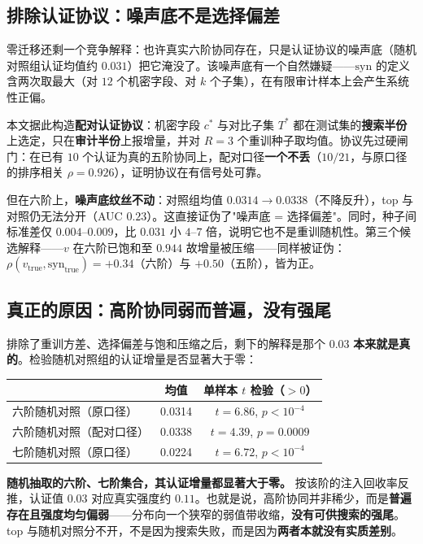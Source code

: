 \documentclass[10.5pt,compsoc,UTF8]{CjC}
\theoremstyle{mystyle}
\begin{document}
\subsection{排除认证协议：噪声底不是选择偏差}

零迁移还剩一个竞争解释：也许真实六阶协同存在，只是认证协议的噪声底（随机对照组认证均值约 $0.031$）把它淹没了。该噪声底有一个自然嫌疑——$\mathrm{syn}$ 的定义含两次取最大（对 $12$ 个机密字段、对 $k$ 个子集），在有限审计样本上会产生系统性正偏。

本文据此构造\textbf{配对认证协议}：机密字段 $c^\ast$ 与对比子集 $T^\ast$ 都在测试集的\textbf{搜索半份}上选定，只在\textbf{审计半份}上报增量，并对 $R=3$ 个重训种子取均值。协议先过硬闸门：在已有 $10$ 个认证为真的五阶协同上，配对口径\textbf{一个不丢}（$10/21$，与原口径的排序相关 $\rho=0.926$），证明协议在有信号处可靠。

但在六阶上，\textbf{噪声底纹丝不动}：对照组均值 $0.0314\to0.0338$（不降反升），top 与对照仍无法分开（AUC $0.23$）。这直接证伪了"噪声底 = 选择偏差"。同时，种子间标准差仅 $0.004$--$0.009$，比 $0.031$ 小 $4$--$7$ 倍，说明它也不是重训随机性。第三个候选解释——$v$ 在六阶已饱和至 $0.944$ 故增量被压缩——同样被证伪：$\rho(v_{\mathrm{true}},\mathrm{syn}_{\mathrm{true}})=+0.34$（六阶）与 $+0.50$（五阶），皆为正。

\subsection{真正的原因：高阶协同弱而普遍，没有强尾}
\label{sec:notail}

排除了重训方差、选择偏差与饱和压缩之后，剩下的解释是那个 $0.03$ \textbf{本来就是真的}。检验随机对照组的认证增量是否显著大于零：

\begin{center}
\begin{tabular}{lcc}
\toprule
& 均值 & 单样本 $t$ 检验（$>0$）\\
\midrule
六阶随机对照（原口径） & 0.0314 & $t=6.86$, $p<10^{-4}$\\
六阶随机对照（配对口径） & 0.0338 & $t=4.39$, $p=0.0009$\\
七阶随机对照（原口径） & 0.0224 & $t=6.72$, $p<10^{-4}$\\
\bottomrule
\end{tabular}
\end{center}

\textbf{随机抽取的六阶、七阶集合，其认证增量都显著大于零。} 按该阶的注入回收率反推，认证值 $0.03$ 对应真实强度约 $0.11$。也就是说，高阶协同并非稀少，而是\textbf{普遍存在且强度均匀偏弱}——分布向一个狭窄的弱值带收缩，\textbf{没有可供搜索的强尾}。top 与随机对照分不开，不是因为搜索失败，而是因为\textbf{两者本就没有实质差别}。
\end{document}
